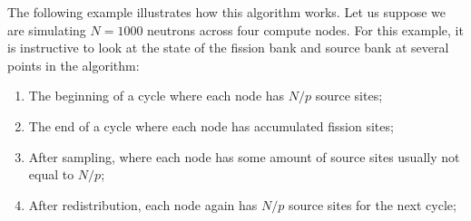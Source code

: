 The following example illustrates how this algorithm works. Let us
suppose we are simulating $N = 1000$ neutrons across four compute
nodes. For this example, it is instructive to look at the state of the
fission bank and source bank at several points in the algorithm:
\begin{enumerate}
\item The beginning of a cycle where each node has $N/p$ source sites;
\item The end of a cycle where each node has accumulated fission sites;
\item After sampling, where each node has some amount of source sites
  usually not equal to $N/p$;
\item After redistribution, each node again has $N/p$ source sites for
  the next cycle;
\end{enumerate}


